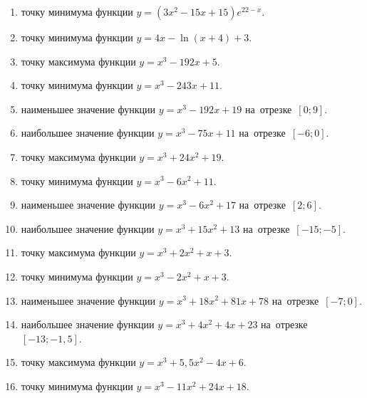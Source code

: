 \documentclass[a4paper,10pt]{article}
\begin{document}
\begin{enumerate}
\item {} точку минимума функции $y=\left(3x^2-15x+15\right){{e}^{22-x}}$.

\item {} точку минимума функции $y=4x-\ln \left(x+4\right)+3$.

\item {} точку максимума функции $y=x^3 -192x +5$.

\item {} точку минимума функции $y=x^3 -243x+11$.

\item {} наименьшее значение функции $y=x^3 -192x+19$ на~отрезке~$\left[0;9\right]$.

\item {} наибольшее значение функции $y=x^3 -75x+11$ на~отрезке~$\left[-6;0\right]$.

\item {} точку максимума функции $y=x^3 +24x^2+19$.

\item {} точку минимума функции $y=x^3 -6x^2+11$.

\item {} наименьшее значение функции $y=x^3 -6x^2+17$ на~отрезке~$\left[2;6\right]$.

\item {} наибольшее значение функции $y=x^3 +15x^2+13$ на~отрезке~$\left[-15;-5\right]$.

\item {} точку максимума функции $y=x^3 +2x^2+x+3$.

\item {} точку минимума функции $y=x^3 -2x^2+x+3$.

\item {} наименьшее значение функции $y=x^3 +18x^2+81x+78$ на~отрезке~$\left[-7;0\right]$.

\item {} наибольшее значение функции $y=x^3 +4x^2+4x+23$ на~отрезке~$\left[-13;-1,5\right]$.

\item {} точку максимума функции $y=x^3 +5,5x^2-4x+6$.

\item {} точку минимума функции $y=x^3 -11x^2+24x+18$.


\end{enumerate}
\end{document}
